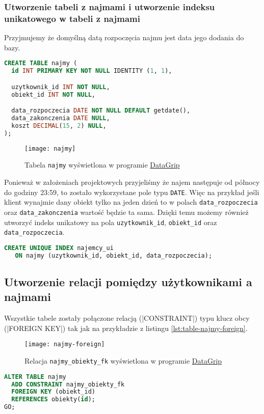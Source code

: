 \subsubsection{Utworzenie tabeli z najmami i utworzenie indeksu unikatowego w tabeli z najmami}

Przyjmujemy że domyślną datą rozpoczęcia najmu jest data jego dodania do bazy.

\begin{lstlisting}[language=SQL, caption={Skrypt tworzący tabelę \texttt{najmy}}, label={lst:table-najmy}]
CREATE TABLE najmy (
  id INT PRIMARY KEY NOT NULL IDENTITY (1, 1),

  uzytkownik_id INT NOT NULL,
  obiekt_id INT NOT NULL,

  data_rozpoczecia DATE NOT NULL DEFAULT getdate(),
  data_zakonczenia DATE NULL,
  koszt DECIMAL(15, 2) NULL,
);
\end{lstlisting}

\begin{figure}[h]
	\centering
    \texttt{[image: najmy]}
	\caption{Tabela \texttt{najmy} wyświetlona w programie \href{https://www.jetbrains.com/datagrip/}{DataGrip}}
	\label{fig:najmy}
\end{figure}

Ponieważ w założeniach projektowych przyjeliśmy że najem następuje od północy do godziny 23:59, to zostało wykorzystane pole typu \texttt{DATE}. Więc na przykład jeśli klient wynajmie dany obiekt tylko na jeden dzień to w polach \texttt{data\_rozpoczecia} oraz \texttt{data\_zakonczenia} wartość będzie ta sama. Dzięki temu możemy również utworzyć indeks unikatowy na pola \texttt{uzytkownik\_id}, \texttt{obiekt\_id} oraz \texttt{data\_rozpoczecia}.

\begin{lstlisting}[language=SQL, caption={Skrypt tworzący indeks unikatowy w tabeli \texttt{obiekty}}, label={lst:table-najmy}]
CREATE UNIQUE INDEX najemcy_ui
   ON najmy (uzytkownik_id, obiekt_id, data_rozpoczecia);
\end{lstlisting}

\subsection{Utworzenie relacji pomiędzy użytkownikami a najmami}

Wszystkie tabele zostały połączone relacją (|CONSTRAINT|) typu klucz obcy (|FOREIGN KEY|) tak jak na przykładzie z listingu \ref{lst:table-najmy-foreign}.

\begin{figure}[h]
	\centering
    \texttt{[image: najmy-foreign]}
	\caption{Relacja \texttt{najmy\_obiekty\_fk} wyświetlona w programie \href{https://www.jetbrains.com/datagrip/}{DataGrip}}
	\label{fig:najmy-foreign}
\end{figure}

\begin{lstlisting}[language=SQL, caption={Skrypt tworzący relację \texttt{najmy\_obiekty\_fk}}, label={lst:table-najmy-foreign}]
ALTER TABLE najmy
  ADD CONSTRAINT najmy_obiekty_fk
  FOREIGN KEY (obiekt_id)
  REFERENCES obiekty(id);
GO;
\end{lstlisting}
